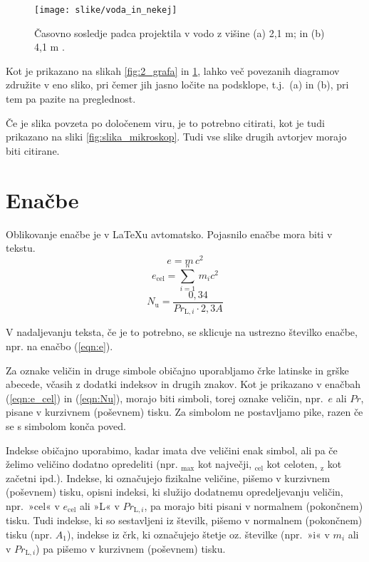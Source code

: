 \begin{figure}[ht!]
	\begin{centering}
		\texttt{[image: slike/voda\_in\_nekej]}
		\caption{Časovno sosledje padca projektila v vodo z višine (a) 2,1 m; in (b) 4,1 m \cite{bazant_1991}.} \label{fig:voda_in_nekej}
	\end{centering}
\end{figure}

Kot je prikazano na slikah \ref{fig:2_grafa} in \ref{fig:voda_in_nekej}, lahko več povezanih diagramov združite v eno sliko, pri čemer jih jasno ločite na podsklope, t.j.\ (a) in (b), pri tem pa pazite na preglednost.

Če je slika povzeta po določenem viru, je to potrebno citirati, kot je tudi prikazano na sliki \ref{fig:slika_mikroskop}. Tudi vse slike drugih avtorjev morajo biti citirane.

\section{Enačbe}\label{sec:enacbe}

Oblikovanje enačbe je v \LaTeX u avtomatsko. Pojasnilo enačbe mora biti v tekstu.
\begin{equation}\label{eqn:e}
e = m\,c^2
\end{equation}
\begin{equation}\label{eqn:e_cel}
e_{\text{cel}}=\sum_{i=1}^{n}\,m_{i}c^2
\end{equation}
\begin{equation}\label{eqn:Nu}
N_{\text{u}} = \frac{0{,}34}{Pr_{\text{L},i}\cdot 2{,}3A}
\end{equation}

V nadaljevanju teksta, če je to potrebno, se sklicuje na ustrezno številko enačbe, npr. na enačbo (\ref{eqn:e}).

Za oznake veličin in druge simbole običajno uporabljamo črke latinske in grške abecede, včasih z dodatki indeksov in drugih znakov. Kot je prikazano v enačbah (\ref{eqn:e_cel}) in (\ref{eqn:Nu}), morajo biti simboli, torej oznake veličin, npr.\ $e$ ali $Pr$, pisane v kurzivnem (poševnem) tisku. Za simbolom ne postavljamo pike, razen če se s simbolom konča poved.

Indekse običajno uporabimo, kadar imata dve veličini enak simbol, ali pa če želimo veličino dodatno opredeliti (npr. $_{\text{max}}$ kot največji, $_{\text{cel}}$ kot celoten, $_{\text{z}}$ kot začetni ipd.). Indekse, ki označujejo fizikalne veličine, pišemo v kurzivnem (poševnem) tisku, opisni indeksi, ki služijo dodatnemu opredeljevanju veličin, npr.\ »cel« v $e_{\text{cel}}$ ali »L« v $Pr_{\text{L},i}$, pa morajo biti pisani v normalnem (pokončnem) tisku. Tudi indekse, ki so sestavljeni iz številk, pišemo v normalnem (pokončnem) tisku (npr. $A_1$), indekse iz črk, ki označujejo štetje oz. številke (npr.\ »i« v $m_i$ ali v $Pr_{\text{L},i}$) pa pišemo v kurzivnem (poševnem) tisku.

